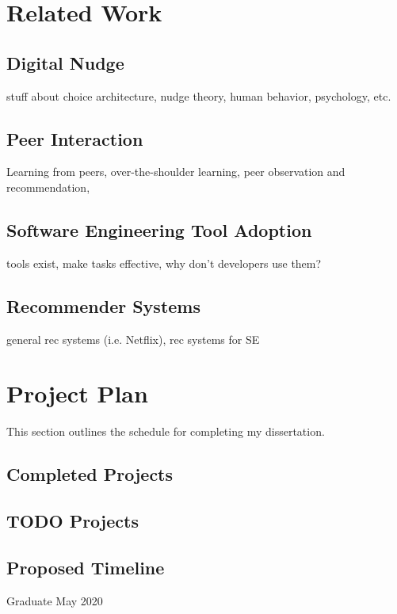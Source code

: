 \documentclass[runningheads]{llncs}
\begin{document}
\section{Related Work}

\subsection{Digital Nudge}
stuff about choice architecture, nudge theory, human behavior, psychology, etc.

\subsection{Peer Interaction}

Learning from peers, over-the-shoulder learning, peer observation and recommendation,

\subsection{Software Engineering Tool Adoption}

tools exist, make tasks effective, why don't developers use them?

\subsection{Recommender Systems}

general rec systems (i.e. Netflix), rec systems for SE

\section{Project Plan}

This section outlines the schedule for completing my dissertation.

\subsection{Completed Projects}

\subsection{TODO Projects}

\subsection{Proposed Timeline}
Graduate May 2020
\end{document}
